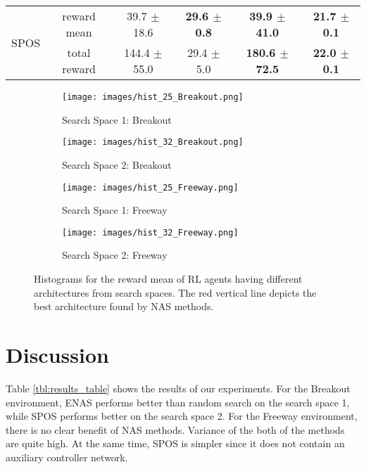 \documentclass{svproc}
\begin{document}
\begin{table}[t]
\begin{tabularx}{\textwidth}{@{}lccccc@{}}
\multirow{2}{*}{SPOS}   & reward mean               & 39.7 $\pm$ 18.6         & \textbf{29.6 $\pm$ 0.8}    & \textbf{39.9 $\pm$ 41.0}     & \textbf{21.7 $\pm$ 0.1}     \\ 
                        & total reward              & 144.4 $\pm$ 55.0         & 29.4 $\pm$ 5.0             & \textbf{180.6 $\pm$ 72.5}    & \textbf{22.0 $\pm$ 0.1}              \\ 

\bottomrule
\end{tabularx}
\end{table}

\begin{figure}[t]
\centering
\begin{subfigure}{0.45\linewidth}
    \texttt{[image: images/hist\_25\_Breakout.png]}
    \caption{Search Space 1: Breakout}
\end{subfigure}
\hfil
\begin{subfigure}{0.45\linewidth}
    \texttt{[image: images/hist\_32\_Breakout.png]}
    \caption{Search Space 2: Breakout}
\end{subfigure}

\begin{subfigure}{0.45\linewidth}
    \texttt{[image: images/hist\_25\_Freeway.png]}
    \caption{Search Space 1: Freeway}
\end{subfigure}
\hfil
\begin{subfigure}{0.45\linewidth}
    \texttt{[image: images/hist\_32\_Freeway.png]}
    \caption{Search Space 2: Freeway}
\end{subfigure}
\caption{Histograms for the reward mean of RL agents having different architectures from search spaces. The red vertical line depicts the best architecture found by NAS methods.}
\label{fig:histograms}
\end{figure}


\section{Discussion}
Table \ref{tbl:results_table} shows the results of our experiments.
For the Breakout environment, ENAS performs better than random search on the search space 1, while SPOS performs better on the search space 2. For the Freeway environment, there is no clear benefit of NAS methods. Variance of the both of the methods are quite high.
At the same time, SPOS is simpler since it does not contain an auxiliary controller network. 
\end{document}
